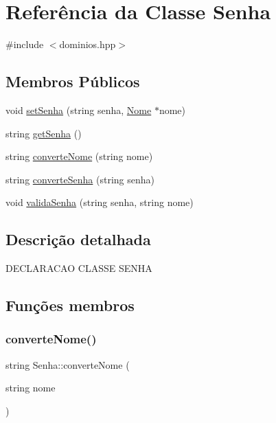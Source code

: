 \hypertarget{class_senha}{}\section{Referência da Classe Senha}
\label{class_senha}


{\ttfamily \#include $<$dominios.\+hpp$>$}

\subsection*{Membros Públicos}
\begin{DoxyCompactItemize}
\item 
void \mbox{\hyperlink{class_senha_a01bbc2a82c5f405b68f33fe0dc538ec1}{set\+Senha}} (string senha, \mbox{\hyperlink{class_nome}{Nome}} $\ast$nome)
\item 
string \mbox{\hyperlink{class_senha_a8786b3d03b1652e73df1cdce46cbbaaf}{get\+Senha}} ()
\item 
string \mbox{\hyperlink{class_senha_a39b73424d487b79e150b97400585e78b}{converte\+Nome}} (string nome)
\item 
string \mbox{\hyperlink{class_senha_a64d982211a22299b77487531bdc18e1f}{converte\+Senha}} (string senha)
\item 
void \mbox{\hyperlink{class_senha_a5c87578fbe77800cee8c8f51d7a06d17}{valida\+Senha}} (string senha, string nome)
\end{DoxyCompactItemize}


\subsection{Descrição detalhada}
D\+E\+C\+L\+A\+R\+A\+C\+AO C\+L\+A\+S\+SE S\+E\+N\+HA 

\subsection{Funções membros}
\mbox{\label{class_senha_a39b73424d487b79e150b97400585e78b}} 
\subsubsection{\texorpdfstring{converte\+Nome()}{converteNome()}}
{\footnotesize\ttfamily string Senha\+::converte\+Nome (\begin{DoxyParamCaption}\item[{string}]{nome }\end{DoxyParamCaption})}


